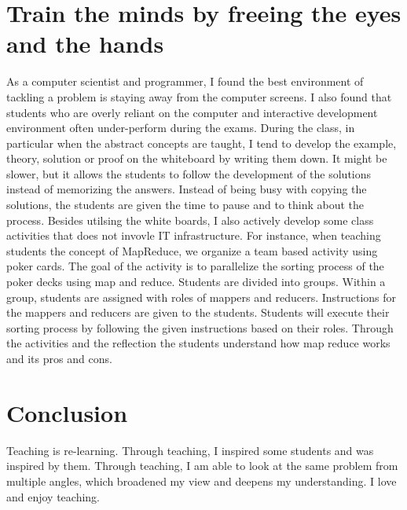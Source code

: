 \documentclass[12pt]{article}
\theoremstyle{plain} \numberwithin{equation}{section}
\theoremstyle{definition}
\begin{document}
\section{Train the minds by freeing the eyes and the hands}
As a computer scientist and programmer, I found the best environment
of tackling a problem is staying away from the computer screens. I
also found that students who are overly reliant on the computer and
interactive development environment often under-perform during the
exams. During the class, in particular when the abstract concepts are
taught, I tend to develop the example, theory, solution or proof on
the whiteboard by writing them down. It might be slower, but it allows 
the students to follow the development of the
solutions instead of memorizing the answers. Instead of being busy with copying
the solutions, the students are given the time to pause and to think about the
process. Besides utilsing the white boards, I also actively develop
some class activities that does not invovle IT infrastructure. For
instance, when teaching students the concept of MapReduce, we organize
a team based activity using poker cards. The goal of the activity is to parallelize the
sorting process of the poker decks using  map and reduce. 
Students are divided into groups. Within a group, students are assigned with roles of
mappers and reducers. Instructions for the mappers and reducers are
given to the students. Students will execute their sorting process by
following the given instructions based on their
roles. Through the activities and the reflection the students understand
how map reduce works and its pros and cons. 

\section{Conclusion}
Teaching is re-learning. Through teaching, I inspired some
students and was inspired by them. Through teaching, I am able to look at
the same problem from multiple angles, which broadened my view and deepens my
understanding. I love and enjoy teaching. 
\end{document}
